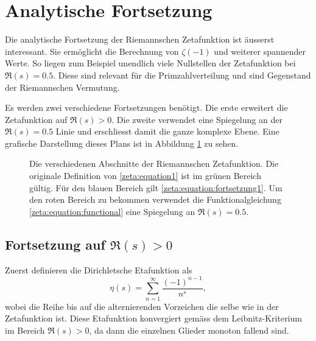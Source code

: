 \section{Analytische Fortsetzung} \label{zeta:section:analytische_fortsetzung}

Die analytische Fortsetzung der Riemannschen Zetafunktion ist äusserst interessant.
Sie ermöglicht die Berechnung von $\zeta(-1)$ und weiterer spannender Werte.
So liegen zum Beispiel unendlich viele Nullstellen der Zetafunktion bei $\Re(s) = 0.5$.
Diese sind relevant für die Primzahlverteilung und sind Gegenstand der Riemannschen Vermutung.

Es werden zwei verschiedene Fortsetzungen benötigt.
Die erste erweitert die Zetafunktion auf $\Re(s) > 0$.
Die zweite verwendet eine Spiegelung an der $\Re(s) = 0.5$ Linie und erschliesst damit die ganze komplexe Ebene.
Eine grafische Darstellung dieses Plans ist in Abbildung \ref{zeta:fig:continuation_overview} zu sehen.
\begin{figure}
    \centering
    
    \caption{
        Die verschiedenen Abschnitte der Riemannschen Zetafunktion. 
        Die originale Definition von \eqref{zeta:equation1} ist im grünen Bereich gültig.
        Für den blauen Bereich gilt \eqref{zeta:equation:fortsetzung1}.
        Um den roten Bereich zu bekommen verwendet die Funktionalgleichung \eqref{zeta:equation:functional} eine Spiegelung an $\Re(s) = 0.5$.
    }
    \label{zeta:fig:continuation_overview}
\end{figure}

\subsection{Fortsetzung auf $\Re(s) > 0$} \label{zeta:subsection:auf_bereich_ge_0}
Zuerst definieren die Dirichletsche Etafunktion als
\begin{equation}\label{zeta:equation:eta}
    \eta(s)
    =
    \sum_{n=1}^{\infty}
    \frac{(-1)^{n-1}}{n^s},
\end{equation}
wobei die Reihe bis auf die alternierenden Vorzeichen die selbe wie in der Zetafunktion ist.
Diese Etafunktion konvergiert gemäss dem Leibnitz-Kriterium im Bereich $\Re(s) > 0$, da dann die einzelnen Glieder monoton fallend sind.

